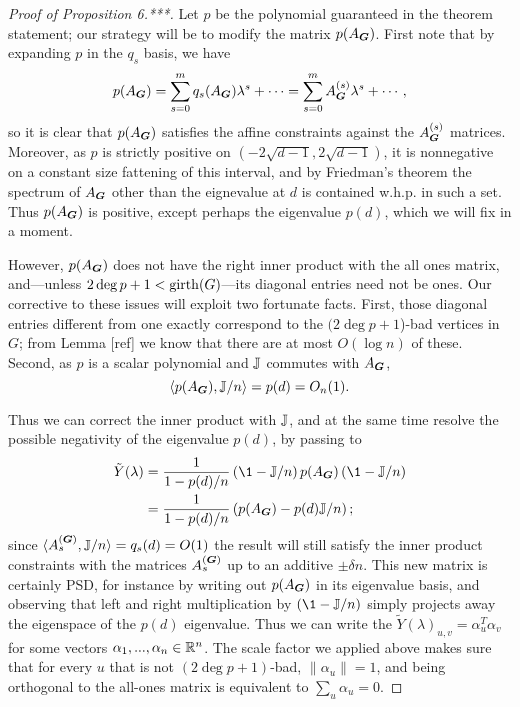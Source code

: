 \begin{proof}[Proof of Proposition 6.***]
    Let $p$ be the polynomial guaranteed in the theorem statement; our strategy will be to modify the matrix $p(A_{\boldsymbol{G}})$. First note that by expanding $p$ in the $q_s$ basis, we have
    $$
        p(A_{\boldsymbol{G}}) = \sum_{s = 0}^m q_s(A_{\boldsymbol{G}})\lambda^s + \cdots = \sum_{s=0}^m A^{(s)}_{\boldsymbol{G}}\lambda^s + \cdots,
    $$
    so it is clear that $p(A_{\boldsymbol{G}})$ satisfies the affine constraints against the $A^{(s)}_{\boldsymbol{G}}$ matrices. Moreover, as $p$ is strictly positive on $(-2\sqrt{d-1},2\sqrt{d-1})$, it is nonnegative on a constant size fattening of this interval, and by Friedman's theorem the spectrum of $A_{\boldsymbol{G}}$ other than the eignevalue at $d$ is contained w.h.p. in such a set. Thus $p(A_{\boldsymbol{G}})$ is positive, except perhaps the eigenvalue $p(d)$, which we will fix in a moment.
    
    However, $p(A_{\boldsymbol{G}})$ does not have the right inner product with the all ones matrix, and---unless $2\deg p + 1 < \operatorname{girth}(G)$---its diagonal entries need not be ones. Our corrective to these issues will exploit two fortunate facts. First, those diagonal entries different from one exactly correspond to the $(2\deg p + 1$)-bad vertices in $G$; from Lemma [ref] we know that there are at most $O(\log n)$ of these. Second, as $p$ is a scalar polynomial and $\mathbb{J}$ commutes with $A_{\boldsymbol{G}}$,
    $$
        \langle p(A_{\boldsymbol{G}}),\mathbb{J}/n \rangle = p(d) = O_n(1).
    $$
    
    Thus we can correct the inner product with $\mathbb{J}$, and at the same time resolve the possible negativity of the eigenvalue $p(d)$, by passing to
    \begin{align*}
         \tilde Y(\lambda) 
         &= \frac{1}{1 - p(d)/n}\left(\1 - \bbJ/n\right)p(A_{\bG})\left(\1 - \bbJ/n\right) \\
         &= \frac{1}{1 - p(d)/n}\left(p(A_{\bG}) - p(d)\bbJ/n\right);
    \end{align*}
    since $\langle A^{(\boldsymbol{G})}_{s},\mathbb{J}/n\rangle = q_s(d) = O(1)$ the result will still satisfy the inner product constraints with the matrices $A^{(\boldsymbol{G})}_{s}$ up to an additive $\pm \delta n$. This new matrix is certainly PSD, for instance by writing out $p(A_{\boldsymbol{G}})$ in its eigenvalue basis, and observing that left and right multiplication by $(\1 - \bbJ/n)$ simply projects away the eigenspace of the $p(d)$ eigenvalue. Thus we can write the $\tilde Y(\lambda)_{u,v} = \alpha_u^T\alpha_v$ for some vectors $\alpha_1,...,\alpha_n \in \mathbb{R}^n$. The scale factor we applied above makes sure that for every $u$ that is not $(2\deg p + 1)$-bad, $\|\alpha_u\| = 1$, and being orthogonal to the all-ones matrix is equivalent to $\sum_u \alpha_u = 0$.
    

\end{proof}
